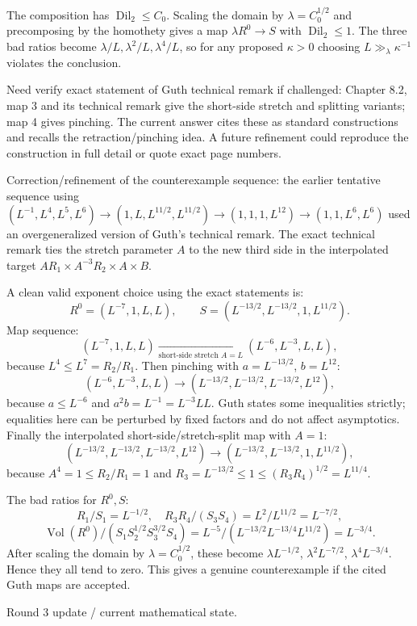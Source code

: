 \documentclass[12pt]{article}
\newcommand{\Dil}{\operatorname{Dil}}
\begin{document}
The composition has \(\Dil_2\le C_0\).  Scaling the domain by
\(\lambda=C_0^{1/2}\) and precomposing by the homothety gives a map
\(\lambda R^0\to S\) with \(\Dil_2\le1\).  The three bad ratios become
\(\lambda/L,\lambda^2/L,\lambda^4/L\), so for any proposed \(\kappa>0\) choosing
\(L\gg_\lambda \kappa^{-1}\) violates the conclusion.

Need verify exact statement of Guth technical remark if challenged: Chapter 8.2,
map 3 and its technical remark give the short-side stretch and splitting variants;
map 4 gives pinching.  The current answer cites these as standard constructions and
recalls the retraction/pinching idea.  A future refinement could reproduce the
construction in full detail or quote exact page numbers.


Correction/refinement of the counterexample sequence: the earlier tentative
sequence using
\((L^{-1},L^4,L^5,L^6)\to(1,L,L^{11/2},L^{11/2})\to(1,1,1,L^{12})\to(1,1,L^6,L^6)\)
used an overgeneralized version of Guth's technical remark.  The exact technical
remark ties the stretch parameter \(A\) to the new third side in the interpolated
target \(AR_1\times A^{-3}R_2\times A\times B\).

A clean valid exponent choice using the exact statements is:
\[
R^0=(L^{-7},1,L,L),\qquad
S=(L^{-13/2},L^{-13/2},1,L^{11/2}).
\]
Map sequence:
\[
(L^{-7},1,L,L)
 \xrightarrow[\text{short-side stretch }A=L]{}
(L^{-6},L^{-3},L,L),
\]
because \(L^4\le L^7=R_2/R_1\).
Then pinching with \(a=L^{-13/2}\), \(b=L^{12}\):
\[
(L^{-6},L^{-3},L,L)
 \to (L^{-13/2},L^{-13/2},L^{-13/2},L^{12}),
\]
because \(a\le L^{-6}\) and \(a^2b=L^{-1}=L^{-3}LL\).  Guth states some inequalities strictly; equalities here can be perturbed by fixed factors and do not affect asymptotics.
Finally the interpolated short-side/stretch-split map with \(A=1\):
\[
(L^{-13/2},L^{-13/2},L^{-13/2},L^{12})
 \to (L^{-13/2},L^{-13/2},1,L^{11/2}),
\]
because \(A^4=1\le R_2/R_1=1\) and
\(R_3=L^{-13/2}\le1\le(R_3R_4)^{1/2}=L^{11/4}\).

The bad ratios for \(R^0,S\):
\[
R_1/S_1=L^{-1/2},\quad
R_3R_4/(S_3S_4)=L^2/L^{11/2}=L^{-7/2},
\]
\[
\operatorname{Vol}(R^0)/(S_1S_2^{1/2}S_3^{3/2}S_4)
=L^{-5}/(L^{-13/2}L^{-13/4}L^{11/2})=L^{-3/4}.
\]
After scaling the domain by \(\lambda=C_0^{1/2}\), these become
\(\lambda L^{-1/2}\), \(\lambda^2L^{-7/2}\), \(\lambda^4L^{-3/4}\).  Hence they
all tend to zero.  This gives a genuine counterexample if the cited Guth maps are
accepted.



Round 3 update / current mathematical state.
\end{document}
